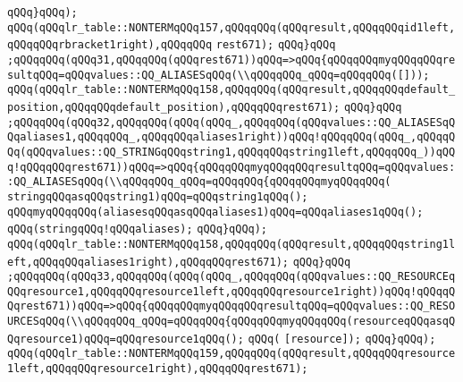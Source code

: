 \verb|qQQq}qQQq);|\newline
\verb|qQQq(qQQqlr_table::NONTERMqQQq157,qQQqqQQq(qQQqresult,qQQqqQQqid1left,qQQqqQQqrbracket1right),qQQqqQQq|\newline
\verb|rest671);|\newline
\verb|qQQq}qQQq|\newline
\verb|;qQQqqQQq(qQQq31,qQQqqQQq(qQQqrest671))qQQq=>qQQq{qQQqqQQqmyqQQqqQQqresultqQQq=qQQqvalues::QQ_ALIASESqQQq(\\qQQqqQQq_qQQq=qQQqqQQq([]));|\newline
\verb|qQQq(qQQqlr_table::NONTERMqQQq158,qQQqqQQq(qQQqresult,qQQqqQQqdefault_position,qQQqqQQqdefault_position),qQQqqQQqrest671);|\newline
\verb|qQQq}qQQq|\newline
\verb|;qQQqqQQq(qQQq32,qQQqqQQq(qQQq(qQQq_,qQQqqQQq(qQQqvalues::QQ_ALIASESqQQqaliases1,qQQqqQQq_,qQQqqQQqaliases1right))qQQq!qQQqqQQq(qQQq_,qQQqqQQq(qQQqvalues::QQ_STRINGqQQqstring1,qQQqqQQqstring1left,qQQqqQQq_))qQQq!qQQqqQQqrest671))qQQq=>qQQq{qQQqqQQqmyqQQqqQQqresultqQQq=qQQqvalues::QQ_ALIASESqQQq(\\qQQqqQQq_qQQq=qQQqqQQq{qQQqqQQqmyqQQqqQQq(|\newline
\verb|stringqQQqasqQQqstring1)qQQq=qQQqstring1qQQq();|\newline
\verb|qQQqmyqQQqqQQq(aliasesqQQqasqQQqaliases1)qQQq=qQQqaliases1qQQq();|\newline
\verb|qQQq(stringqQQq!qQQqaliases);|\newline
\verb|qQQq}qQQq);|\newline
\verb|qQQq(qQQqlr_table::NONTERMqQQq158,qQQqqQQq(qQQqresult,qQQqqQQqstring1left,qQQqqQQqaliases1right),qQQqqQQqrest671);|\newline
\verb|qQQq}qQQq|\newline
\verb|;qQQqqQQq(qQQq33,qQQqqQQq(qQQq(qQQq_,qQQqqQQq(qQQqvalues::QQ_RESOURCEqQQqresource1,qQQqqQQqresource1left,qQQqqQQqresource1right))qQQq!qQQqqQQqrest671))qQQq=>qQQq{qQQqqQQqmyqQQqqQQqresultqQQq=qQQqvalues::QQ_RESOURCESqQQq(\\qQQqqQQq_qQQq=qQQqqQQq{qQQqqQQqmyqQQqqQQq(resourceqQQqasqQQqresource1)qQQq=qQQqresource1qQQq();|\newline
\verb|qQQq(|\newline
\verb|[resource]);|\newline
\verb|qQQq}qQQq);|\newline
\verb|qQQq(qQQqlr_table::NONTERMqQQq159,qQQqqQQq(qQQqresult,qQQqqQQqresource1left,qQQqqQQqresource1right),qQQqqQQqrest671);|\newline
